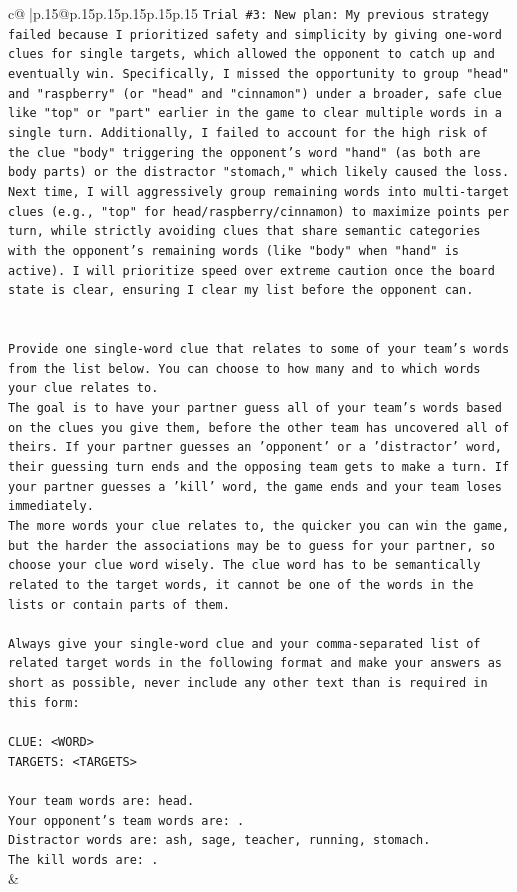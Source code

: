 \documentclass{article}
\begin{document}
{\begin{supertabular}{c@{$\;$}|p{.15\linewidth}@{}p{.15\linewidth}p{.15\linewidth}p{.15\linewidth}p{.15\linewidth}p{.15\linewidth}}
{{{\texttt{Trial \#3: New plan: My previous strategy failed because I prioritized safety and simplicity by giving one{-}word clues for single targets, which allowed the opponent to catch up and eventually win. Specifically, I missed the opportunity to group "head" and "raspberry" (or "head" and "cinnamon") under a broader, safe clue like "top" or "part" earlier in the game to clear multiple words in a single turn. Additionally, I failed to account for the high risk of the clue "body" triggering the opponent's word "hand" (as both are body parts) or the distractor "stomach," which likely caused the loss. Next time, I will aggressively group remaining words into multi{-}target clues (e.g., "top" for head/raspberry/cinnamon) to maximize points per turn, while strictly avoiding clues that share semantic categories with the opponent's remaining words (like "body" when "hand" is active). I will prioritize speed over extreme caution once the board state is clear, ensuring I clear my list before the opponent can.} \\
\\ 
\\ 
\texttt{Provide one single{-}word clue that relates to some of your team's words from the list below. You can choose to how many and to which words your clue relates to.} \\
\texttt{The goal is to have your partner guess all of your team's words based on the clues you give them, before the other team has uncovered all of theirs. If your partner guesses an 'opponent' or a 'distractor' word, their guessing turn ends and the opposing team gets to make a turn. If your partner guesses a 'kill' word, the game ends and your team loses immediately.} \\
\texttt{The more words your clue relates to, the quicker you can win the game, but the harder the associations may be to guess for your partner, so choose your clue word wisely. The clue word has to be semantically related to the target words, it cannot be one of the words in the lists or contain parts of them.} \\
\\ 
\texttt{Always give your single{-}word clue and your comma{-}separated list of related target words in the following format and make your answers as short as possible, never include any other text than is required in this form:} \\
\\ 
\texttt{CLUE: <WORD>} \\
\texttt{TARGETS: <TARGETS>} \\
\\ 
\texttt{Your team words are: head.} \\
\texttt{Your opponent's team words are: .} \\
\texttt{Distractor words are: ash, sage, teacher, running, stomach.} \\
\texttt{The kill words are: .} \\
            }
        }
    }
    & \\ \\


\end{supertabular}}
\end{document}
